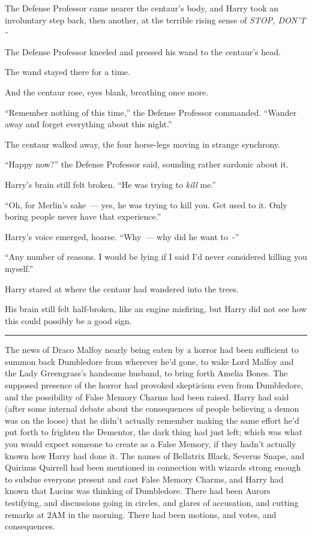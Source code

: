 The Defense Professor came nearer the centaur's body, and Harry took an involuntary step back, then another, at the terrible rising sense of \emph{STOP, DON'T -}

The Defense Professor kneeled and pressed his wand to the centaur's head.

The wand stayed there for a time.

And the centaur rose, eyes blank, breathing once more.

``Remember nothing of this time,'' the Defense Professor commanded. ``Wander away and forget everything about this night.''

The centaur walked away, the four horse-legs moving in strange synchrony.

``Happy now?'' the Defense Professor said, sounding rather sardonic about it.

Harry's brain still felt broken. ``He was trying to \emph{kill} me.''

``Oh, for Merlin's sake~--- yes, he was trying to kill you. Get used to it. Only boring people never have that experience.''

Harry's voice emerged, hoarse. ``Why~--- why did he want to~-''

``Any number of reasons. I would be lying if I said I'd never considered killing you myself.''

Harry stared at where the centaur had wandered into the trees.

His brain still felt half-broken, like an engine misfiring, but Harry did not see how this could possibly be a good sign.

\begin{center}\rule{3in}{0.4pt}\end{center}

The news of Draco Malfoy nearly being eaten by a horror had been sufficient to summon back Dumbledore from wherever he'd gone, to wake Lord Malfoy and the Lady Greengrass's handsome husband, to bring forth Amelia Bones. The supposed presence of the horror had provoked skepticism even from Dumbledore, and the possibility of False Memory Charms had been raised. Harry had said (after some internal debate about the consequences of people believing a demon was on the loose) that he didn't actually remember making the same effort he'd put forth to frighten the Dementor, the dark thing had just left; which was what you would expect someone to create as a False Memory, if they hadn't actually known how Harry had done it. The names of Bellatrix Black, Severus Snape, and Quirinus Quirrell had been mentioned in connection with wizards strong enough to subdue everyone present and cast False Memory Charms, and Harry had known that Lucius was thinking of Dumbledore. There had been Aurors testifying, and discussions going in circles, and glares of accusation, and cutting remarks at 2AM in the morning. There had been motions, and votes, and consequences.

